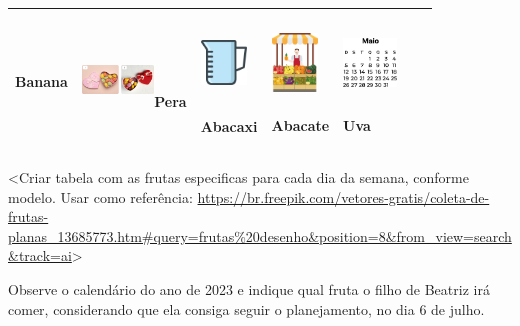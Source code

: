 \begin{escolha}
\begin{escolha}
{{{{{{{{\begin{longtable}[]{@{}lllllll@{}}
\begin{minipage}[t]{0.14\columnwidth}
Banana\strut
\end{minipage} & \begin{minipage}[t]{0.14\columnwidth}\raggedright\strut
\includegraphics[width=0.75448in,height=0.58371in]{media/image152.png}Pera\strut
\end{minipage} & \begin{minipage}[t]{0.14\columnwidth}\raggedright\strut
\includegraphics[width=0.48354in,height=0.74826in]{media/image153.png}

Abacaxi\strut
\end{minipage} & \begin{minipage}[t]{0.14\columnwidth}\raggedright\strut
\includegraphics[width=0.48530in,height=0.73899in]{media/image154.png}

Abacate\strut
\end{minipage} & \begin{minipage}[t]{0.14\columnwidth}\raggedright\strut
\includegraphics[width=0.55895in,height=0.73793in]{media/image155.png}

Uva\strut
\end{minipage}\tabularnewline
\bottomrule
\end{longtable}

\textless{}Criar tabela com as frutas especificas para cada dia da
semana, conforme modelo. Usar como referência:
\url{https://br.freepik.com/vetores-gratis/coleta-de-frutas-planas_13685773.htm\#query=frutas\%20desenho\&position=8\&from_view=search\&track=ai}\textgreater{}

Observe o calendário do ano de 2023 e indique qual fruta o filho de
Beatriz irá comer, considerando que ela consiga seguir o planejamento, no dia 6 de julho.

}}}}}}}}
\end{escolha}
\end{escolha}
